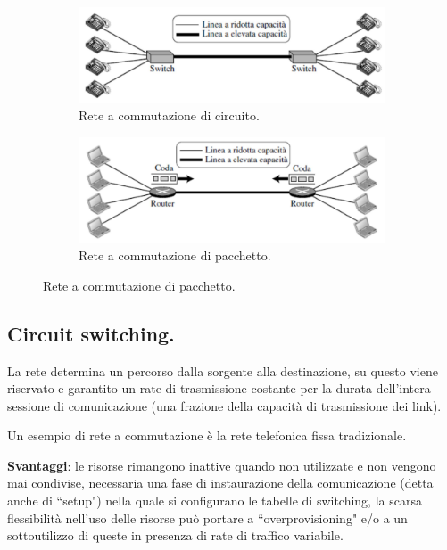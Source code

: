 \documentclass[11pt, italian, openany]{book}
\begin{document}
\begin{sloppypar}
\begin{figure}[h!]
	\begin{subfigure}{0.49 \linewidth} \centering
		\includegraphics[scale=0.25]{images/commutazione-circuito.png}
		\caption{Rete a commutazione di circuito.}
	\end{subfigure}
	\begin{subfigure}{0.49 \linewidth} \centering
		\includegraphics[scale=0.25]{images/commutazione-pacchetto.png}
		\caption{Rete a commutazione di pacchetto.}
	\end{subfigure}
\end{figure}

\subsection*{Circuit switching.}
La rete determina un percorso dalla sorgente alla destinazione, su questo viene riservato e garantito un rate di trasmissione costante per la
durata dell'intera sessione di comunicazione (una frazione della capacit\`a di trasmissione dei link).

Un esempio di rete a commutazione \`e la rete telefonica fissa tradizionale.

\textbf{Svantaggi}: le risorse rimangono inattive quando non utilizzate e non vengono mai condivise, necessaria una fase di instaurazione della
comunicazione (detta anche di ``setup") nella quale si configurano le tabelle di switching, la scarsa flessibilit\`a nell'uso delle risorse pu\`o
portare a ``overprovisioning" e/o a un sottoutilizzo di queste in presenza di rate di traffico variabile.


\end{sloppypar}
\end{document}
